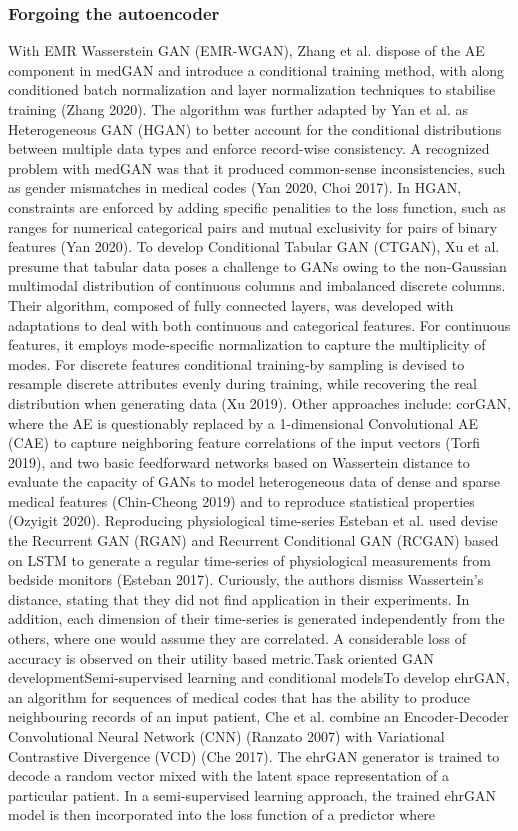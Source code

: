 \subsubsection{Forgoing the autoencoder}\label{noauto}

With EMR Wasserstein GAN (EMR-WGAN), Zhang et al. dispose of the AE component in medGAN and introduce a conditional training method, with along conditioned batch normalization and layer normalization techniques to stabilise training (Zhang 2020). The algorithm was further adapted by Yan et al. as Heterogeneous GAN (HGAN) to better account for the conditional distributions between multiple data types and enforce record-wise consistency. A recognized problem with medGAN was that it produced common-sense inconsistencies, such as gender mismatches in medical codes (Yan 2020, Choi 2017). In HGAN, constraints are enforced by adding specific penalities to the loss function, such as ranges for numerical categorical pairs and mutual exclusivity for pairs of binary features (Yan 2020). To develop Conditional Tabular GAN (CTGAN), Xu et al. presume that tabular data poses a challenge to GANs owing to the non-Gaussian multimodal distribution of continuous columns and imbalanced discrete columns. Their algorithm, composed of fully connected layers, was developed with adaptations to deal with both continuous and categorical features. For continuous features, it employs mode-specific normalization to capture the multiplicity of modes. For discrete features conditional training-by sampling is devised to resample discrete attributes evenly during training, while recovering the real distribution when generating data (Xu 2019). Other approaches include: corGAN, where the AE is questionably replaced by a 1-dimensional Convolutional AE (CAE) to capture neighboring feature correlations of the input vectors (Torfi 2019), and two basic feedforward networks based on Wassertein distance to evaluate the capacity of GANs to model heterogeneous data of dense and sparse medical features (Chin-Cheong 2019) and to reproduce statistical properties (Ozyigit 2020). Reproducing physiological time-series Esteban et al. used devise the Recurrent GAN (RGAN) and Recurrent Conditional GAN (RCGAN) based on LSTM to generate a regular time-series of physiological measurements from bedside monitors (Esteban 2017). Curiously, the authors dismiss Wassertein's distance, stating that they did not find application in their experiments. In addition, each dimension of their time-series is generated independently from the others, where one would assume they are correlated. A considerable loss of accuracy is observed on their utility based metric.Task oriented GAN developmentSemi-supervised learning and conditional modelsTo develop ehrGAN, an algorithm for sequences of medical codes that has the ability to produce neighbouring records of an input patient, Che et al. combine an Encoder-Decoder Convolutional Neural Network (CNN) (Ranzato 2007) with Variational Contrastive Divergence (VCD) (Che 2017). The ehrGAN generator is trained to decode a random vector mixed with the latent space representation of a particular patient. In a semi-supervised learning approach, the trained ehrGAN model is then incorporated into the loss function of a predictor where 